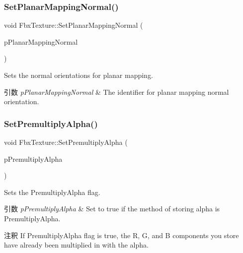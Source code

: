 \subsubsection{\texorpdfstring{Set\+Planar\+Mapping\+Normal()}{SetPlanarMappingNormal()}}
{\footnotesize\ttfamily void Fbx\+Texture\+::\+Set\+Planar\+Mapping\+Normal (\begin{DoxyParamCaption}\item[{\hyperlink{class_fbx_texture_a6115b6970e4c83198112530d1e6f578c}{E\+Planar\+Mapping\+Normal}}]{p\+Planar\+Mapping\+Normal }\end{DoxyParamCaption})}

Sets the normal orientations for planar mapping. 
\begin{DoxyParams}{引数}
{\em p\+Planar\+Mapping\+Normal} & The identifier for planar mapping normal orientation. \\
\hline
\end{DoxyParams}
\mbox{\label{class_fbx_texture_af244c477cedbba956106e03aca85867f}} 
\subsubsection{\texorpdfstring{Set\+Premultiply\+Alpha()}{SetPremultiplyAlpha()}}
{\footnotesize\ttfamily void Fbx\+Texture\+::\+Set\+Premultiply\+Alpha (\begin{DoxyParamCaption}\item[{bool}]{p\+Premultiply\+Alpha }\end{DoxyParamCaption})}

Sets the Premultiply\+Alpha flag. 
\begin{DoxyParams}{引数}
{\em p\+Premultiply\+Alpha} & Set to {\ttfamily true} if the method of storing alpha is Premultiply\+Alpha. \\
\hline
\end{DoxyParams}
\begin{DoxyRemark}{注釈}
If Premultiply\+Alpha flag is true, the R, G, and B components you store have already been multiplied in with the alpha. 
\end{DoxyRemark}
\mbox{\label{class_fbx_texture_a2626c877d3bcbc16c74b8bb8a5dbd46d}} 
